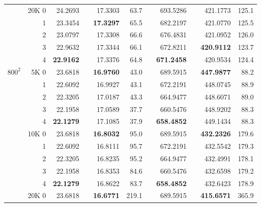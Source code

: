 \begin{table}[p!]
{\begin{tabular*}{\hsize}{crrrrrlrrrr}
\cline{2-11}
                & 20K 0   &      24.2693  &      &      17.3303  &  63.7 &  &      693.5286  &      &      421.1773  & 125.1 \\
                &     1   &      23.3454  &      & {\bf 17.3297} &  65.5 &  &      682.2197  &      &      421.0770  & 125.5 \\
                &     2   &      23.0797  &      &      17.3308  &  66.6 &  &      676.4831  &      &      421.0952  & 126.0 \\
                &     3   &      22.9632  &      &      17.3344  &  66.1 &  &      672.8211  &      & {\bf 420.9112} & 123.7 \\
                &     4   & {\bf 22.9162} &      &      17.3376  &  64.8 &  & {\bf 671.2458} &      &      420.9534  & 124.4 \\
\hline
$800^2$         &  5K 0   &      23.6818  &      & {\bf 16.9760} &  43.0 &  &      689.5915  &      & {\bf 447.9877} &  88.2 \\
                &     1   &      22.6092  &      &      16.9927  &  43.1 &  &      672.2191  &      &      448.0745  &  88.9 \\
                &     2   &      22.3205  &      &      17.0187  &  43.3 &  &      664.9477  &      &      448.6071  &  89.0 \\
                &     3   &      22.1958  &      &      17.0589  &  37.7 &  &      660.5476  &      &      448.9202  &  88.3 \\
                &     4   & {\bf 22.1279} &      &      17.1085  &  37.9 &  & {\bf 658.4852} &      &      449.1434  &  88.3 \\
\cline{2-11}
                & 10K 0   &      23.6818  &      & {\bf 16.8032} &  95.0 &  &      689.5915  &      & {\bf 432.2326} & 179.6 \\
                &     1   &      22.6092  &      &      16.8111  &  95.7 &  &      672.2191  &      &      432.5542  & 179.3 \\
                &     2   &      22.3205  &      &      16.8235  &  95.2 &  &      664.9477  &      &      432.4991  & 178.1 \\
                &     3   &      22.1958  &      &      16.8353  &  84.6 &  &      660.5476  &      &      432.6598  & 179.2 \\
                &     4   & {\bf 22.1279} &      &      16.8622  &  83.7 &  & {\bf 658.4852} &      &      432.6423  & 178.9 \\
\cline{2-11}
                & 20K 0   &      23.6818  &      & {\bf 16.6771} & 219.1 &  &      689.5915  &      & {\bf 415.6571} & 365.9 \\

\end{tabular*}}
\end{table}
